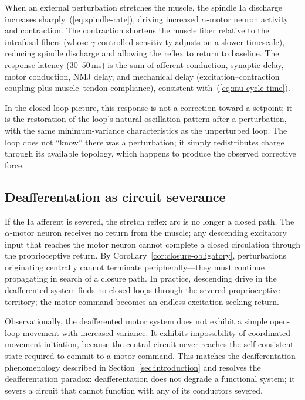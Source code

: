 \documentclass[11pt,twocolumn,a4paper]{article}
\theoremstyle{definition}
\theoremstyle{remark}
\begin{document}
When an external perturbation stretches the muscle, the spindle Ia
discharge increases sharply~(\ref{eq:spindle-rate}), driving increased
$\alpha$-motor neuron activity and contraction. The contraction
shortens the muscle fiber relative to the intrafusal fibers (whose
$\gamma$-controlled sensitivity adjusts on a slower timescale),
reducing spindle discharge and allowing the reflex to return to
baseline. The response latency ($30$--$50$\,ms) is the sum of
afferent conduction, synaptic delay, motor conduction, NMJ delay, and
mechanical delay (excitation--contraction coupling plus
muscle--tendon compliance), consistent with~(\ref{eq:mu-cycle-time}).

In the closed-loop picture, this response is not a correction toward a
setpoint; it is the restoration of the loop's natural oscillation
pattern after a perturbation, with the same minimum-variance
characteristics as the unperturbed loop. The loop does not ``know''
there was a perturbation; it simply redistributes charge through its
available topology, which happens to produce the observed corrective
force.

\subsection{Deafferentation as circuit severance}

If the Ia afferent is severed, the stretch reflex arc is no longer a
closed path. The $\alpha$-motor neuron receives no return from the
muscle; any descending excitatory input that reaches the motor neuron
cannot complete a closed circulation through the proprioceptive return.
By Corollary~\ref{cor:closure-obligatory}, perturbations originating
centrally cannot terminate peripherally---they must continue
propagating in search of a closure path. In practice, descending drive
in the deafferented system finds no closed loops through the severed
proprioceptive territory; the motor command becomes an endless
excitation seeking return.

Observationally, the deafferented motor system does not exhibit a
simple open-loop movement with increased variance. It exhibits
impossibility of coordinated movement initiation, because the central
circuit never reaches the self-consistent state required to commit to
a motor command. This matches the deafferentation phenomenology
described in Section~\ref{sec:introduction} and resolves the
deafferentation paradox: deafferentation does not degrade a functional
system; it severs a circuit that cannot function with any of its
conductors severed.
\end{document}

